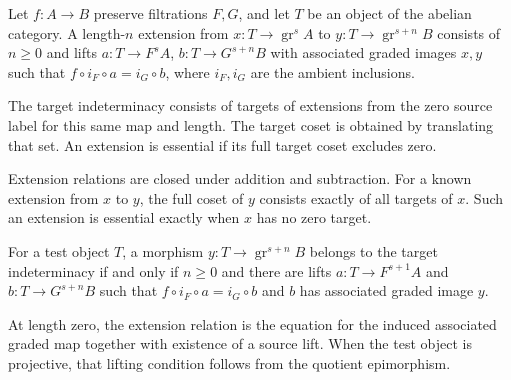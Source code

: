 \begin{definition}
\label{sem:SpectralSequence:extension-equation}
Let $f:A\to B$ preserve filtrations $F,G$, and let $T$ be an object of the abelian category. A length-$n$ extension from $x:T\to\operatorname{gr}^s A$ to $y:T\to\operatorname{gr}^{s+n}B$ consists of $n\geq0$ and lifts $a:T\to F^sA$, $b:T\to G^{s+n}B$ with associated graded images $x,y$ such that $f\circ i_F\circ a=i_G\circ b$, where $i_F,i_G$ are the ambient inclusions.

The target indeterminacy consists of targets of extensions from the zero source label for this same map and length. The target coset is obtained by translating that set. An extension is essential if its full target coset excludes zero.

Extension relations are closed under addition and subtraction. For a known extension from $x$ to $y$, the full coset of $y$ consists exactly of all targets of $x$. Such an extension is essential exactly when $x$ has no zero target.

For a test object $T$, a morphism $y:T\to\operatorname{gr}^{s+n}B$ belongs to the target indeterminacy if and only if $n\geq0$ and there are lifts $a:T\to F^{s+1}A$ and $b:T\to G^{s+n}B$ such that $f\circ i_F\circ a=i_G\circ b$ and $b$ has associated graded image $y$.

At length zero, the extension relation is the equation for the induced associated graded map together with existence of a source lift. When the test object is projective, that lifting condition follows from the quotient epimorphism.
\end{definition}


